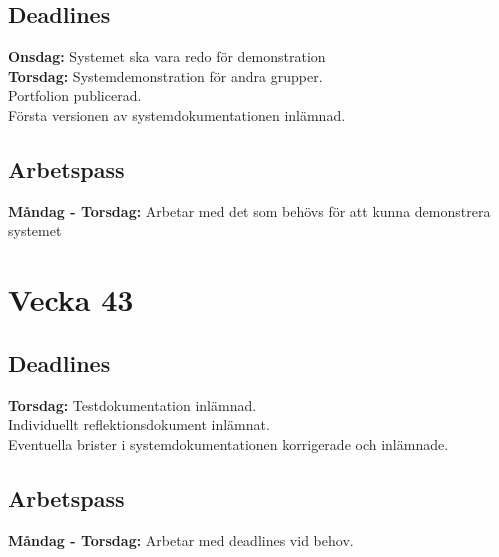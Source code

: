 \documentclass{TDP003mall}
\begin{document}
\subsection*{Deadlines}
\textbf{Onsdag: }Systemet ska vara redo för demonstration\\
\textbf{Torsdag: }Systemdemonstration för andra grupper.\\
\-\hspace{47pt}Portfolion publicerad.\\
\-\hspace{47pt}Första versionen av systemdokumentationen inlämnad.

\subsection*{Arbetspass}
\textbf{Måndag - Torsdag: }Arbetar med det som behövs för att kunna demonstrera systemet


\section*{Vecka 43}
\subsection*{Deadlines}
\textbf{Torsdag: }Testdokumentation inlämnad.\\
\-\hspace{47pt}Individuellt reflektionsdokument inlämnat.\\
\-\hspace{47pt}Eventuella brister i systemdokumentationen korrigerade och inlämnade. 

\subsection*{Arbetspass}
\textbf{Måndag - Torsdag: }Arbetar med deadlines vid behov.
\end{document}
